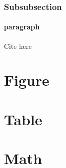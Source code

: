 \documentclass[12pt,a4paper]{article}
\begin{document}
\subsubsection{Subsubsection}
\paragraph{paragraph}
Cite here \cite{latex}


\section{Figure}


\clearpage
\section{Table}

\clearpage

\section{Math}


\clearpage
\renewcommand\bibname{References}


\appendix
\end{document}
